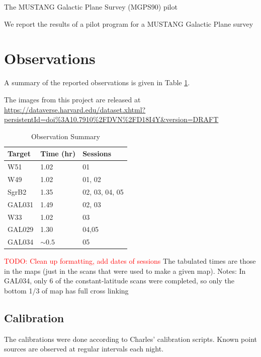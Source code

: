 \documentclass[twocolumn]{aastex62}
\def\todo#1{{\textcolor{red}{TODO: #1}}}
\begin{document}
The MUSTANG Galactic Plane Survey (MGPS90) pilot

We report the results of a pilot program for a MUSTANG Galactic Plane survey

\section{Observations}

A summary of the reported observations is given in Table \ref{tab:observations}.

The images from this project are released at
\url{https://dataverse.harvard.edu/dataset.xhtml?persistentId=doi%3A10.7910%2FDVN%2FD18I4Y&version=DRAFT}

\begin{table}[htp]
\centering
\caption{Observation Summary}
\begin{tabular}{lll}
    \label{tab:observations}
Target   &      Time (hr) &       Sessions   \\
\hline
W51      &      1.02      &        01        \\
W49      &      1.02      &        01, 02    \\
SgrB2    &      1.35      &   02, 03, 04, 05 \\
GAL031   &      1.49      &        02, 03    \\
W33      &      1.02      &        03        \\
GAL029   &      1.30      &        04,05     \\
GAL034   &     $\sim0.5$  &   05             \\
\hline
\end{tabular}
\par
\todo{Clean up formatting, add dates of sessions}
The tabulated times are those in the maps (just in the scans that were used to
make a given map).  Notes:
In GAL034, only 6 of the constant-latitude scans were completed, so only the bottom
1/3 of map has full cross linking
\end{table}

\subsection{Calibration}

The calibrations were done according to Charles' calibration scripts. Known
point sources are observed at regular intervals each night.
\end{document}
